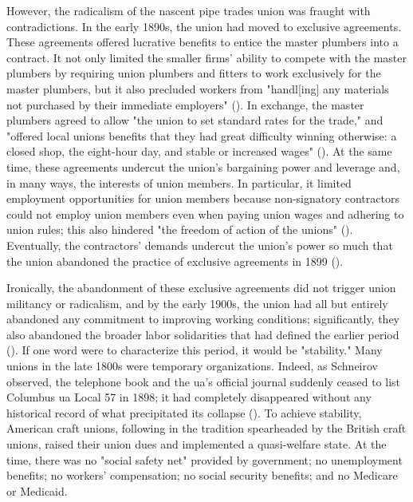 \documentclass[12pt]{article}
\begin{document}
However, the radicalism of the nascent pipe trades union was fraught with contradictions. In the early 1890s, the union had moved to exclusive agreements. These agreements offered lucrative benefits to entice the master plumbers into a contract. It not only limited the smaller firms’ ability to compete with the master plumbers by requiring union plumbers and fitters to work exclusively for the master plumbers, but it also precluded workers from "handl[ing] any materials not purchased by their immediate employers" (\cite[54]{schneirovPrideSolidarityHistory1993}). In exchange, the master plumbers agreed to allow "the union to set standard rates for the trade," and "offered local unions benefits that they had great difficulty winning otherwise: a closed shop, the eight-hour day, and stable or increased wages" (\citeyear[54]{schneirovPrideSolidarityHistory1993}). At the same time, these agreements undercut the union’s bargaining power and leverage and, in many ways, the interests of union members. In particular, it limited employment opportunities for union members because non-signatory contractors could not employ union members even when paying union wages and adhering to union rules; this also hindered "the freedom of action of the unions" (\citeyear[54]{schneirovPrideSolidarityHistory1993}). Eventually, the contractors’ demands undercut the union’s power so much that the union abandoned the practice of exclusive agreements in 1899 (\citeyear[54–55]{schneirovPrideSolidarityHistory1993}).

Ironically, the abandonment of these exclusive agreements did not trigger union militancy or radicalism, and by the early 1900s, the union had all but entirely abandoned any commitment to improving working conditions; significantly, they also abandoned the broader labor solidarities that had defined the earlier period (\cite[51–54]{schneirovPrideSolidarityHistory1993}). If one word were to characterize this period, it would be "stability." Many unions in the late 1800s were temporary organizations. Indeed, as Schneirov observed, the telephone book and the \acrshort{ua}’s official journal suddenly ceased to list Columbus \acrshort{ua} Local 57 in 1898; it had completely disappeared without any historical record of what precipitated its collapse  (\citeyear[51]{schneirovPrideSolidarityHistory1993}). To achieve stability, American craft unions, following in the tradition spearheaded by the British craft unions, raised their union dues and implemented a quasi-welfare state. At the time, there was no "social safety net" provided by government; no unemployment benefits; no workers' compensation; no social security benefits; and no Medicare or Medicaid. 
\end{document}

